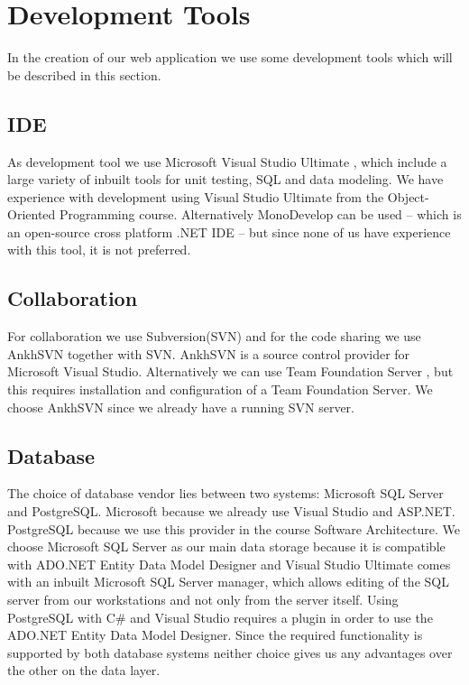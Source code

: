 \section{Development Tools}
In the creation of our web application we use some development tools which will be described in this section. 

\subsection{IDE}
\label{sub:ide}
As development tool we use Microsoft Visual Studio Ultimate \cite{visualStudio}, which include a large variety of inbuilt tools for unit testing, SQL and data modeling. 
We have experience with development using Visual Studio Ultimate from the Object-Oriented Programming course. 
Alternatively MonoDevelop \cite{mono} can be used -- which is an open-source cross platform .NET IDE -- but since none of us have experience with this tool, it is not preferred.



\subsection{Collaboration}
\label{sub:collaboration}
For collaboration we use Subversion(SVN) and for the code sharing we use AnkhSVN \cite{ankhsvn} together with SVN. 
AnkhSVN is a source control provider for Microsoft Visual Studio. 
Alternatively we can use Team Foundation Server \cite{teamfoundation}, but this requires installation and configuration of a Team Foundation Server. 
We choose AnkhSVN since we already have a running SVN server. 

\subsection{Database}
\label{sub:database}
The choice of database vendor lies between two systems: Microsoft SQL Server and PostgreSQL. Microsoft because we already use Visual Studio and ASP.NET. PostgreSQL because we use this provider in the course Software Architecture. 
We choose Microsoft SQL Server as our main data storage because it is compatible with ADO.NET Entity Data Model Designer and Visual Studio Ultimate comes with an inbuilt Microsoft SQL Server manager, which allows editing of the SQL server from our workstations and not only from the server itself. 
Using PostgreSQL with C\# and Visual Studio requires a plugin in order to use the ADO.NET Entity Data Model Designer. Since the required functionality is supported by both database systems neither choice gives us any advantages over the other on the data layer.